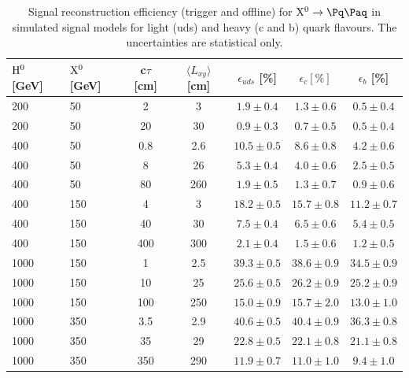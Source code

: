 \begin{table}[htbp]
\caption{
Signal reconstruction efficiency (trigger and offline) for $\X \to \qq$ in simulated signal models for light (uds) and heavy (c and b) quark flavours.  The uncertainties are statistical only. \label{tab:sigeffflavor}}
\centering
\begin{tabular}{llccccc}
\hline
$\mathrm{H}^{0}$ [GeV] & $\mathrm{X^{0}}$ [GeV] & c$\tau$ [cm] & $\langle L_{xy} \rangle$ [cm] & $\epsilon_{uds}$ [\%] & $\epsilon_{c} [\%] $ & $\epsilon_{b}$ [\%]\\
\hline
200 & 50 & 2 & 3 & $1.9\pm0.4$ & $1.3\pm0.6$ & $0.5\pm0.4$ \\
200 & 50 & 20 & 30 & $0.9\pm0.3$ & $0.7\pm0.5$ & $0.5\pm0.4$ \\
\hline
400 & 50 & 0.8 & 2.6 & $10.5\pm0.5$ & $8.6\pm0.8$ & $4.2\pm0.6$ \\
400 & 50 & 8 & 26 & $5.3\pm0.4$ & $4.0\pm0.6$ & $2.5\pm0.5$ \\
400 & 50 & 80 & 260 & $1.9\pm0.5$ & $1.3\pm0.7$ & $0.9\pm0.6$ \\
\hline
400 & 150 & 4 & 3 &  $18.2\pm0.5$ & $15.7\pm0.8$ & $11.2\pm0.7$ \\
400 & 150 & 40 & 30 & $7.5\pm0.4$ & $6.5\pm0.6$ & $5.4\pm0.5$ \\
400 & 150 & 400 & 300 & $2.1\pm0.4$ & $1.5\pm0.6$ & $1.2\pm0.5$ \\
\hline
1000 & 150 & 1 & 2.5 & $39.3\pm0.5$ & $38.6\pm0.9$ & $34.5\pm0.9$ \\
1000 & 150 & 10 & 25 & $25.6\pm0.5$ & $26.2\pm0.9$ & $25.2\pm0.9$ \\
1000 & 150 & 100 & 250 & $15.0\pm0.9$ & $15.7\pm2.0$ & $13.0\pm1.0$ \\
\hline
1000 & 350 & 3.5 & 2.9 &  $40.6\pm0.5$ & $40.4\pm0.9$ & $36.3\pm0.8$ \\
1000 & 350 & 35 & 29 & $22.8\pm0.5$ & $22.1\pm0.8$ & $21.1\pm0.8$ \\
1000 & 350 & 350 & 290 & $11.9\pm0.7$ & $11.0\pm1.0$ & $9.4\pm1.0$ \\
\hline
\end{tabular}
\end{table}

